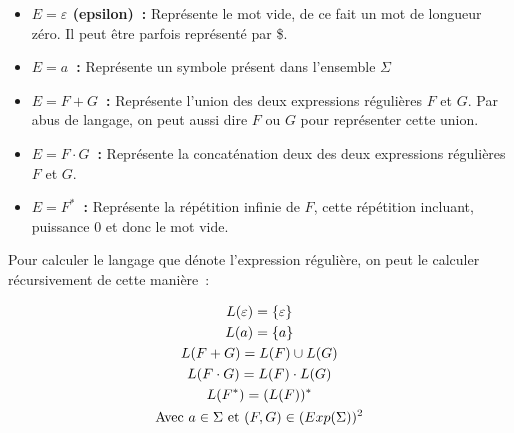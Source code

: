 \vphantom{}

\begin{itemize}
    \item[\textbullet] \textbf{\(E = \varepsilon\) (epsilon)~:}
        Représente le mot vide, de ce fait un mot de longueur zéro. Il peut être
        parfois représenté par \og{}\$\fg{}.

        \vphantom{}

    \item[\textbullet] \textbf{\(E = a\)~:} Représente un symbole
        présent dans l'ensemble \(\Sigma\)

        \vphantom{}

    \item[\textbullet] \textbf{\(E = F + G\)~:} Représente l'union
        des deux expressions régulières \(F\) et \(G\). Par abus de langage, on
        peut aussi dire \(F\) \og{}ou\fg{} \(G\) pour représenter cette union.

        \vphantom{}

    \item[\textbullet] \textbf{\(E = F \cdot G\)~:}
        Représente la concaténation deux des deux expressions régulières
        \(F\) et \(G\).

        \vphantom{}

    \item[\textbullet] \textbf{\(E = F^* \)~:} Représente la
        répétition infinie de \(F\), cette répétition incluant,
        puissance \(0\) et donc le mot vide.
\end{itemize}

\vphantom{}

Pour calculer le langage que dénote l'expression régulière, on peut le calculer
récursivement de cette manière~:

\begin{gather*}
    L(\varepsilon) = \{\varepsilon\} \\
    L(a) = \{a\} \\
    L(F + G) = L(F) \cup L(G) \\
    L(F \cdot G) = L(F) \cdot L(G) \\
    L(F^*) = (L(F))^* \\
    \text{Avec } a \in \Sigma \text{ et } (F, G) \in (Exp(\Sigma))^2 \notag
\end{gather*}

